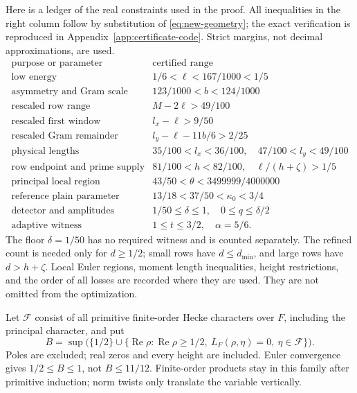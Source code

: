 \documentclass[12pt]{article}
\newcommand{\Rea}{\operatorname{Re}}
\begin{document}
Here is a ledger of the real constraints used in the proof.
All inequalities in the right column follow by substitution of
\eqref{eq:new-geometry}; the exact verification is reproduced in
Appendix~\ref{app:certificate-code}.  Strict margins, not decimal
approximations, are used.
\[
\begin{array}{c|c}
 \text{purpose or parameter}&\text{certified range}\\ \hline
 \text{low energy}&1/6<\ell<167/1000<1/5\\
 \text{asymmetry and Gram scale}&123/1000<b<124/1000\\
 \text{rescaled row range}&M-2\ell>49/100\\
 \text{rescaled first window}&l_x-\ell>9/50\\
 \text{rescaled Gram remainder}&l_y-\ell-11b/6>2/25\\
 \text{physical lengths}&35/100<l_x<36/100,\quad47/100<l_y<49/100\\
 \text{row endpoint and prime supply}&81/100<h<82/100,\quad
                                  \ell/(h+\zeta)>1/5\\
 \text{principal local region}&43/50<\theta<3499999/4000000\\
 \text{reference plain parameter}&13/18<37/50<\kappa_0<3/4\\
 \text{detector and amplitudes}&1/50\le\delta\le1,\quad0\le q\le\delta/2\\
 \text{adaptive witness}&1\le t\le3/2,\quad \alpha=5/6 .
\end{array}
\]
The floor \(\delta=1/50\) has no required witness and is counted
separately.  The refined count is needed only for \(d\ge1/2\);
small rows have \(d\le d_{\min}\), and large rows have \(d>h+\zeta\).
Local Euler regions, moment length inequalities, height restrictions,
and the order of all losses are recorded where they are used.
They are not omitted from the optimization.

Let \(\mathcal F\) consist of all primitive finite-order Hecke
characters over \(F\), including the principal character, and put
\begin{equation}\label{eq:B-definition}
 B=\sup\bigl(\{1/2\}\cup
 \{\Rea\rho:\Rea\rho\ge1/2,\ L_F(\rho,\eta)=0,\
                                     \eta\in\mathcal F\}\bigr).
\end{equation}
Poles are excluded; real zeros and every height are included.
Euler convergence gives \(1/2\le B\le1\), not \(B\le11/12\).
Finite-order products stay in this family after primitive induction;
norm twists only translate the variable vertically.
\end{document}
